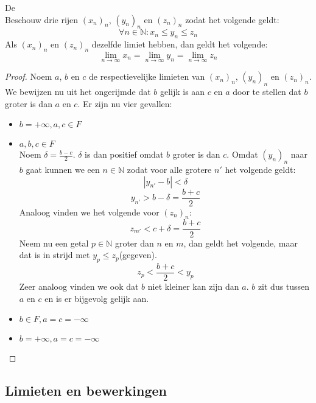 \documentclass[main.tex]{subfiles}
\begin{document}
\begin{st}
  \label{st:insluitstelling}
  De \\
  Beschouw drie rijen $(x_{n})_{n}$, $(y_{n})_{n}$ en $(z_{n})_{n}$ zodat het volgende geldt:
  \[ \forall n\in \mathbb{N}: x_{n}\le y_{n}\le z_{n} \]
  Als $(x_{n})_{n}$ en $(z_{n})_{n}$ dezelfde limiet hebben, dan geldt het volgende:
  \[ \lim_{n\rightarrow \infty}x_{n} = \lim_{n\rightarrow \infty}y_{n} = \lim_{n\rightarrow \infty}z_{n} \]
  \begin{proof}
    Noem $a$, $b$ en $c$ de respectievelijke limieten van $(x_{n})_{n}$, $(y_{n})_{n}$ en $(z_{n})_{n}$.
    We bewijzen nu uit het ongerijmde dat $b$ gelijk is aan $c$ en $a$ door te stellen dat $b$ groter is dan $a$ en $c$.
    Er zijn nu vier gevallen:
    \begin{itemize}
    \item $b = +\infty, a,c \in F$\\
    \item $a,b,c\in F$\\
      Noem $\delta = \frac{b-c}{2}$.
      $\delta$ is dan positief omdat $b$ groter is dan $c$.
      Omdat $(y_{n})_{n}$ naar $b$ gaat kunnen we een $n\in \mathbb{N}$ zodat voor alle grotere $n'$ het volgende geldt:
      \[ |y_{n'}-b|<\delta \]
      \[ y_{n'} > b - \delta = \frac{b+c}{2} \]
      Analoog vinden we het volgende voor $(z_{n})_{n}$:
      \[ z_{m'} < c+\delta = \frac{b+c}{2} \]
      Neem nu een getal $p\in \mathbb{N}$ groter dan $n$ en $m$, dan geldt het volgende, maar dat is in strijd met $y_{p} \le z_{p}$(gegeven).
      \[ z_{p} < \frac{b+c}{2} < y_{p} \]
      Zeer analoog vinden we ook dat $b$ niet kleiner kan zijn dan $a$.
      $b$ zit dus tussen $a$ en $c$ en is er bijgevolg gelijk aan.
    \item $b\in F, a=c = -\infty$\\
    \item $b= +\infty, a=c=-\infty$\\
    \end{itemize}
  \end{proof}
  \feed
\end{st}

\subsection{Limieten en bewerkingen}
\label{sec:limi-en-bewerk}
\end{document}
